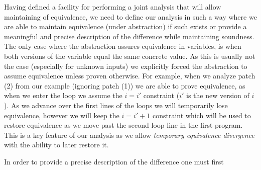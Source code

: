Having defined a facility for performing a joint analysis that will allow maintaining of equivalence, we need to define our analysis in such a way where we are able to maintain equivalence (under abstraction) if such exists or provide a meaningful and precise description of the difference while maintaining soundness. The only case where the abstraction assures equivalence in variables, is when both versions of the variable equal the same concrete value. As this is usually not the case (especially for unknown inputs) we explicitly forced the abstraction to assume equivalence unless proven otherwise. For example, when we analyze patch (2) from our example (ignoring patch (1)) we are able to prove equivalence, as when we enter the loop we assume the ${i = i'}$ constraint ($i'$ is the new version of $i$). As we advance over the first lines of the loops we will temporarily lose equivalence, however we will keep the ${i = i' + 1}$ constraint which will be used to restore equivalence as we move past the second loop line in the first program. This is a key feature of our analysis as we allow \emph{temporary equivalence divergence} with the ability to later restore it.

In order to provide a precise description of the difference one must first





